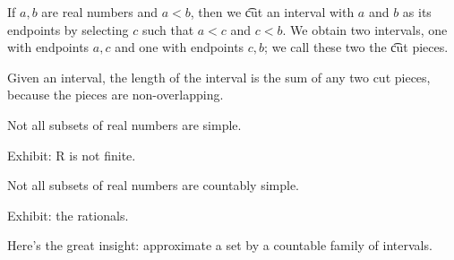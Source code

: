 
If $a, b$ are real numbers and $a < b$, then we \t{cut} an interval with $a$ and $b$ as its endpoints by selecting $c$ such that $a < c$ and $c < b$.
We obtain two intervals, one with endpoints $a,c$ and one with endpoints $c, b$; we call these two the \t{cut pieces}.

Given an interval, the length of the interval is the sum of any two cut pieces, because the pieces are non-overlapping.



\begin{prop}
  Not all subsets of
  real numbers are simple.

  Exhibit: R is not finite.
\end{prop}


\begin{prop}
  Not all subsets of
  real numbers are countably simple.

  Exhibit: the rationals.
\end{prop}

Here's the great insight:
approximate a set
by a countable family of intervals.

